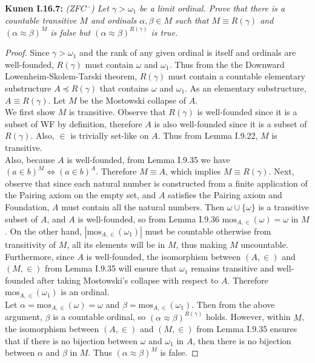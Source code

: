 \documentclass{article}
\begin{document}
\textbf{Kunen I.16.7:} \it (ZFC$^-$) Let $\gamma>\omega_1$ be a limit
  ordinal. Prove that there is a countable transitive $M$ and ordinals
  $\alpha,\beta\in M$ such that $M\equiv R(\gamma)$ and
  $(\alpha\approx\beta)^M$ is false but $(\alpha\approx\beta)^{R(\gamma)}$
  is true.

  \begin{proof}
    Since $\gamma>\omega_1$ and the rank of any given ordinal is itself and
    ordinals are well-founded, $R(\gamma)$ must contain $\omega$ and
    $\omega_1$. Thus from the the Downward Lowenheim-Skolem-Tarski theorem,
    $R(\gamma)$ must contain a countable elementary substructure $A\preceq
    R(\gamma)$ that contains $\omega$ and $\omega_1$. As an elementary
    substructure, $A\equiv R(\gamma)$. Let $M$ be the Mostowski collapse of
    $A$. \\

    We first show $M$ is transitive. Observe that $R(\gamma)$ is
    well-founded since it is a subset of WF by definition, therefore $A$ is
    also well-founded since it is a subset of $R(\gamma)$. Also, $\in$ is
    trivially set-like on $A$. Thus from Lemma I.9.22, $M$ is
    transitive. \\

    Also, because $A$ is well-founded, from Lemma I.9.35 we have $(a\in
    b)^M \Leftrightarrow (a\in b)^A$. Therefore $M\equiv A$, which implies
    $M\equiv R(\gamma)$. Next, observe that since each natural number is
    constructed from a finite application of the Pairing axiom on the empty
    set, and $A$ satisfies the Pairing axiom and Foundation, $A$ must
    contain all the natural numbers. Then $\omega\cup\{\omega\}$ is a
    transitive subset of $A$, and $A$ is well-founded, so from Lemma I.9.36
    $\text{mos}_{A,\in}(\omega)=\omega$ in $M$. On the other hand,
    $|\text{mos}_{A,\in}(\omega_1)|$ must be countable otherwise from
    transitivity of $M$, all its elements will be in $M$, thus making $M$
    uncountable. Furthermore, since $A$ is well-founded, the isomorphism
    between $(A,\in)$ and $(M,\in)$ from Lemma I.9.35 will ensure that
    $\omega_1$ remains transitive and well-founded after taking Mostowski's
    collapse with respect to $A$. Therefore $\text{mos}_{A,\in}(\omega_1)$
    is an ordinal. \\

    Let $\alpha=\text{mos}_{A,\in}(\omega)=\omega$ and
    $\beta=\text{mos}_{A,\in}(\omega_1)$. Then from the above argument,
    $\beta$ is a countable ordinal, so $(\alpha\approx\beta)^{R(\gamma)}$
    holds. However, within $M$, the isomorphism between $(A,\in)$ and
    $(M,\in)$ from Lemma I.9.35 ensures that if there is no bijection
    between $\omega$ and $\omega_1$ in $A$, then there is no bijection
    between $\alpha$ and $\beta$ in $M$. Thus
    $(\alpha\approx\beta)^{M}$ is false.
  \end{proof}
\end{document}
